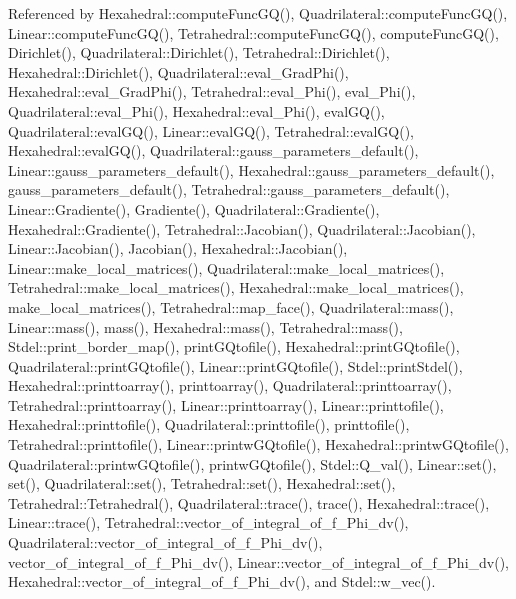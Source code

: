 Referenced by Hexahedral\+::compute\+Func\+G\+Q(), Quadrilateral\+::compute\+Func\+G\+Q(), Linear\+::compute\+Func\+G\+Q(), Tetrahedral\+::compute\+Func\+G\+Q(), compute\+Func\+G\+Q(), Dirichlet(), Quadrilateral\+::\+Dirichlet(), Tetrahedral\+::\+Dirichlet(), Hexahedral\+::\+Dirichlet(), Quadrilateral\+::eval\+\_\+\+Grad\+Phi(), Hexahedral\+::eval\+\_\+\+Grad\+Phi(), Tetrahedral\+::eval\+\_\+\+Phi(), eval\+\_\+\+Phi(), Quadrilateral\+::eval\+\_\+\+Phi(), Hexahedral\+::eval\+\_\+\+Phi(), eval\+G\+Q(), Quadrilateral\+::eval\+G\+Q(), Linear\+::eval\+G\+Q(), Tetrahedral\+::eval\+G\+Q(), Hexahedral\+::eval\+G\+Q(), Quadrilateral\+::gauss\+\_\+parameters\+\_\+default(), Linear\+::gauss\+\_\+parameters\+\_\+default(), Hexahedral\+::gauss\+\_\+parameters\+\_\+default(), gauss\+\_\+parameters\+\_\+default(), Tetrahedral\+::gauss\+\_\+parameters\+\_\+default(), Linear\+::\+Gradiente(), Gradiente(), Quadrilateral\+::\+Gradiente(), Hexahedral\+::\+Gradiente(), Tetrahedral\+::\+Jacobian(), Quadrilateral\+::\+Jacobian(), Linear\+::\+Jacobian(), Jacobian(), Hexahedral\+::\+Jacobian(), Linear\+::make\+\_\+local\+\_\+matrices(), Quadrilateral\+::make\+\_\+local\+\_\+matrices(), Tetrahedral\+::make\+\_\+local\+\_\+matrices(), Hexahedral\+::make\+\_\+local\+\_\+matrices(), make\+\_\+local\+\_\+matrices(), Tetrahedral\+::map\+\_\+face(), Quadrilateral\+::mass(), Linear\+::mass(), mass(), Hexahedral\+::mass(), Tetrahedral\+::mass(), Stdel\+::print\+\_\+border\+\_\+map(), print\+G\+Qtofile(), Hexahedral\+::print\+G\+Qtofile(), Quadrilateral\+::print\+G\+Qtofile(), Linear\+::print\+G\+Qtofile(), Stdel\+::print\+Stdel(), Hexahedral\+::printtoarray(), printtoarray(), Quadrilateral\+::printtoarray(), Tetrahedral\+::printtoarray(), Linear\+::printtoarray(), Linear\+::printtofile(), Hexahedral\+::printtofile(), Quadrilateral\+::printtofile(), printtofile(), Tetrahedral\+::printtofile(), Linear\+::printw\+G\+Qtofile(), Hexahedral\+::printw\+G\+Qtofile(), Quadrilateral\+::printw\+G\+Qtofile(), printw\+G\+Qtofile(), Stdel\+::\+Q\+\_\+val(), Linear\+::set(), set(), Quadrilateral\+::set(), Tetrahedral\+::set(), Hexahedral\+::set(), Tetrahedral\+::\+Tetrahedral(), Quadrilateral\+::trace(), trace(), Hexahedral\+::trace(), Linear\+::trace(), Tetrahedral\+::vector\+\_\+of\+\_\+integral\+\_\+of\+\_\+f\+\_\+\+Phi\+\_\+dv(), Quadrilateral\+::vector\+\_\+of\+\_\+integral\+\_\+of\+\_\+f\+\_\+\+Phi\+\_\+dv(), vector\+\_\+of\+\_\+integral\+\_\+of\+\_\+f\+\_\+\+Phi\+\_\+dv(), Linear\+::vector\+\_\+of\+\_\+integral\+\_\+of\+\_\+f\+\_\+\+Phi\+\_\+dv(), Hexahedral\+::vector\+\_\+of\+\_\+integral\+\_\+of\+\_\+f\+\_\+\+Phi\+\_\+dv(), and Stdel\+::w\+\_\+vec().

